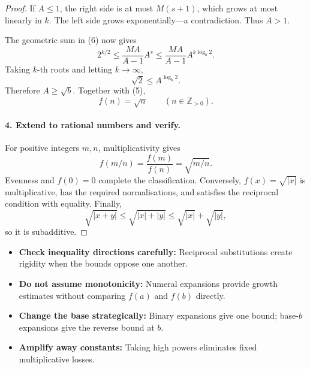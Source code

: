 \begin{dlsummary}[title={\bfseries Solution 62. The Hidden Square Root},breakable]
\begin{proof}
If \(A\le1\), the right side is at most \(M(s+1)\), which grows at most linearly in \(k\). The left side grows exponentially—a contradiction. Thus \(A>1\).

The geometric sum in (6) now gives
\[
2^{k/2}
\le \frac{MA}{A-1}A^s
\le \frac{MA}{A-1}A^{k\log_b2}.
\]
Taking \(k\)-th roots and letting \(k\to\infty\),
\[
\sqrt2\le A^{\log_b2}.
\]
Therefore \(A\ge\sqrt b\). Together with (5),
\[
\boxed{f(n)=\sqrt n\qquad(n\in\mathbb Z_{>0}).}
\]

\paragraph{4. Extend to rational numbers and verify.}

For positive integers \(m,n\), multiplicativity gives
\[
f(m/n)=\frac{f(m)}{f(n)}=\sqrt{m/n}.
\]
Evenness and \(f(0)=0\) complete the classification.
Conversely, \(f(x)=\sqrt{|x|}\) is multiplicative, has the required
normalisations, and satisfies the reciprocal condition with equality. Finally,
\[
\sqrt{|x+y|}
\le\sqrt{|x|+|y|}
\le\sqrt{|x|}+\sqrt{|y|},
\]
so it is subadditive.

\end{proof}
\end{dlsummary}

\begin{takeaways}
\begin{itemize}
\item \textbf{Check inequality directions carefully:} Reciprocal substitutions create rigidity when the bounds oppose one another.
\item \textbf{Do not assume monotonicity:} Numeral expansions provide growth estimates without comparing \(f(a)\) and \(f(b)\) directly.
\item \textbf{Change the base strategically:} Binary expansions give one bound; base-\(b\) expansions give the reverse bound at \(b\).
\item \textbf{Amplify away constants:} Taking high powers eliminates fixed multiplicative losses.
\end{itemize}
\end{takeaways}
